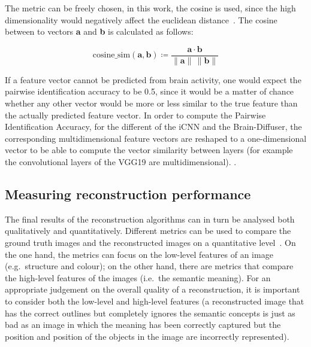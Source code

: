 \noindent{}The  metric can be freely chosen, in this work, the cosine  is used, since the high dimensionality would negatively affect the euclidean distance~\cite{koppen2000curse}. The cosine  between to vectors \textbf{a} and \textbf{b} is calculated as follows:

\[
\text{cosine\_sim}(\mathbf{a}, \mathbf{b}) \coloneq \frac{\mathbf{a} \cdot \mathbf{b}}{\|\mathbf{a}\| \, \|\mathbf{b}\|}
\]

\noindent{}If a feature vector cannot be predicted from brain activity, one would expect the pairwise identification accuracy to be 0.5, since it would be a matter of chance whether any other vector would be more or less similar to the true feature than the actually predicted feature vector. In order to compute the Pairwise Identification Accuracy, for the different  of the iCNN and the Brain-Diffuser, the corresponding multidimensional feature vectors are reshaped to a one-dimensional vector to be able to compute the vector similarity between layers (for example the convolutional layers of the VGG19 are multidimensional). . 




\subsection{Measuring reconstruction performance}

The final results of the reconstruction algorithms can in turn be analysed both qualitatively and quantitatively. Different metrics can be used to compare the ground truth images and the reconstructed images on a quantitative level~\cite{ozcelikNaturalSceneReconstruction2023}. On the one hand, the metrics can focus on the low-level features of an image (e.g.\ structure and colour); on the other hand, there are metrics that compare the high-level features of the images (i.e.\ the semantic meaning). For an appropriate judgement on the overall quality of a reconstruction, it is important to consider both the low-level and high-level features (a reconstructed image that has the correct outlines but completely ignores the semantic concepts is just as bad as an image in which the meaning has been correctly captured but the position and position of the objects in the image are incorrectly represented).

